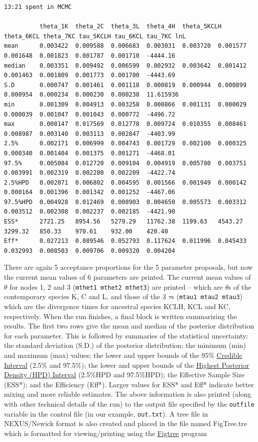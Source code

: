 \documentclass{book}
\numberwithin{equation}{section} \renewcommand{\baselinestretch}{0.55}
\begin{document}
{\begin{verbatim}
13:21 spent in MCMC

          theta_1K  theta_2C  theta_3L	theta_4H  theta_5KCLH theta_6KCL theta_7KC tau_5KCLH tau_6KCL tau_7KC lnL
mean      0.003422  0.009588  0.006683  0.003031  0.003720  0.001577  0.001648  0.001823  0.001787  0.001710  -4444.16
median    0.003351  0.009492  0.006599  0.002932  0.003642  0.001412  0.001463  0.001809  0.001773  0.001700  -4443.69
S.D       0.000747  0.001461  0.001118  0.000819  0.000944  0.000899  0.000954  0.000234  0.000230  0.000238  11.615936
min       0.001309  0.004913  0.003258  0.000866  0.001131  0.000029  0.000039  0.001047  0.001043  0.000772  -4496.72
max       0.008147  0.017569  0.012778  0.009724  0.010355  0.008461  0.008987  0.003140  0.003113  0.002847  -4403.99
2.5%      0.002171  0.006999  0.004743  0.001729  0.002100  0.000325  0.000340  0.001404  0.001375  0.001271  -4468.01
97.5%     0.005084  0.012720  0.009104  0.004919  0.005780  0.003751  0.003991  0.002319  0.002280  0.002209  -4422.74
2.5%HPD   0.002071  0.006802  0.004595  0.001566  0.001949  0.000142  0.000164  0.001396  0.001342  0.001252  -4467.06
97.5%HPD  0.004928  0.012469  0.008903  0.004650  0.005573  0.003312  0.003512  0.002308  0.002237  0.002185  -4421.90
ESS*      2721.25   8954.56   5279.29   11762.38  1199.63   4543.27   3299.32   850.33    970.61    932.00    420.40
Eff*      0.027213  0.089546  0.052793  0.117624  0.011996  0.045433  0.032993  0.008503  0.009706  0.009320  0.004204

\end{verbatim}
  }
There are again 5 acceptance proportions for the 5 parameter proposals, but now the current mean values of 6
parameters are printed. The current mean values of $\theta$ for nodes 1, 2 and 3 (\texttt{mthet1 mthet2 mthet3})
are printed -- which are $\theta$s of the contemporary species K, C and L, and those of
the 3 $\tau$s (\texttt{mtau1  mtau2  mtau3}) which are the divergence times for ancestral species
KCLH, KCL and KC, respectively. When the run finishes, a final block is written summarizing the results. The first two
rows give the mean and median of the posterior distribution for each parameter. This is followed by
summaries of the statistical uncertainty: the standard deviation (S.D.) of the posterior distribution;
the minimum (min) and maximum (max) values; the lower and upper bounds of the 95\%
\href{https://en.wikipedia.org/wiki/Credible_interval}{Credible Interval} (2.5\% and 97.5\%);
the lower and upper bounds of the \href{https://en.wikipedia.org/wiki/Credible_interval}{Highest Posterior Density (HPD) Interval} (2.5\%HPD and 97.5\%HPD);
the Effective Sample Size (ESS*); and the Efficiency (Eff*). Larger values for ESS* and Eff* indicate better
mixing and more reliable estimates.
The above information is also printed (along with other technical details of the run)
to the output file specified by the \texttt{outfile} variable in the control file (in our example, \texttt{out.txt}).
A tree file in NEXUS/Newick format is also created and placed in the file named FigTree.tre which is formatted
for viewing/printing using the \href{http://tree.bio.ed.ac.uk/software/figtree/}{Figtree} program
\end{document}
